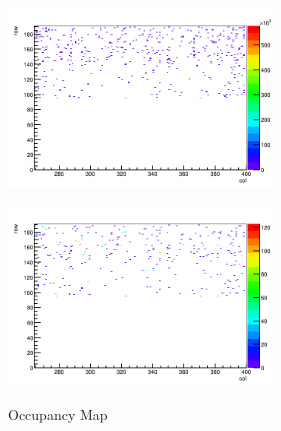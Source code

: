 \begin{figure}[h]
  \centering
  \begin{minipage}[b]{0.45\linewidth}
    \centering
    \includegraphics[width=7cm]{./figure/Noisebf.png}
    \label{fig:bfnoise}
  \end{minipage}
  \begin{minipage}[b]{0.45\linewidth}
    \centering
    \includegraphics[width=7cm]{./figure/Noiseaf.png}
    \label{fig:afnoise}
  \end{minipage}
  \caption{Occupancy Map}
\end{figure}

